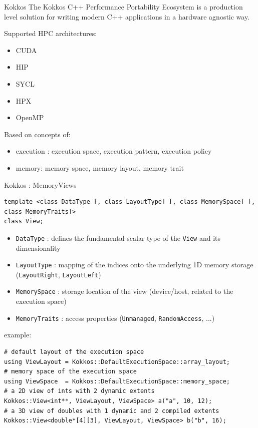 \begin{frame}{Kokkos}
  The Kokkos C++ Performance Portability Ecosystem is a production
  level solution for writing modern C++ applications in a hardware agnostic way.\\
  
  \begin{bkblock}{Supported HPC architectures:}
    \begin{itemize}
      \item CUDA
      \item HIP
      \item SYCL
      \item HPX
      \item OpenMP
    \end{itemize}
  \end{bkblock}

  Based on concepts of:
  \begin{itemize}
    \item execution : execution space, execution pattern, execution policy
    \item memory: memory space, memory layout, memory trait
  \end{itemize}
\end{frame}

\begin{frame}[fragile]{Kokkos : Memory}{Views}
  \begin{verbatim}
template <class DataType [, class LayoutType] [, class MemorySpace] [, class MemoryTraits]>
class View;
  \end{verbatim}
  \begin{itemize}
    \item \verb|DataType| : defines the fundamental scalar type of the \verb|View| and its dimensionality
    \item \verb|LayoutType| : mapping of the indices onto the underlying 1D memory storage (\verb|LayoutRight|, \verb|LayoutLeft|)
    \item \verb|MemorySpace| : storage location of the view (device/host, related to the execution space)
    \item \verb|MemoryTraits| : access properties (\verb|Unmanaged|, \verb|RandomAccess|, ...)
  \end{itemize}

  example:
  \begin{verbatim}
# default layout of the execution space
using ViewLayout = Kokkos::DefaultExecutionSpace::array_layout;
# memory space of the execution space
using ViewSpace  = Kokkos::DefaultExecutionSpace::memory_space;
# a 2D view of ints with 2 dynamic extents
Kokkos::View<int**, ViewLayout, ViewSpace> a("a", 10, 12);
# a 3D view of doubles with 1 dynamic and 2 compiled extents
Kokkos::View<double*[4][3], ViewLayout, ViewSpace> b("b", 16);
  \end{verbatim}
\end{frame}

